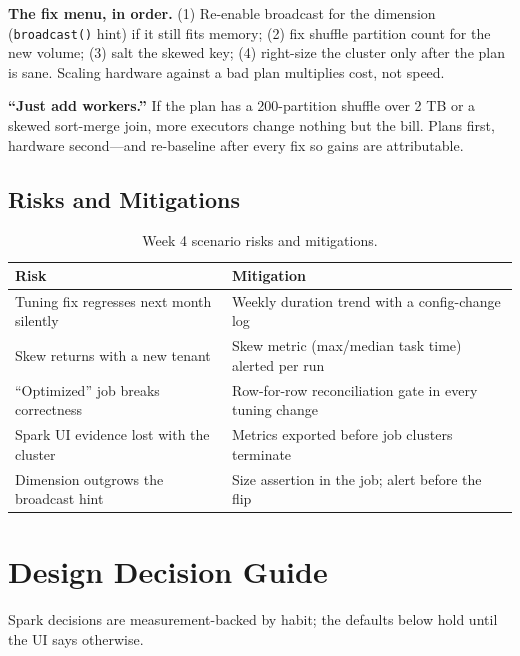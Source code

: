 \textbf{The fix menu, in order.} (1) Re-enable broadcast for the dimension (\texttt{broadcast()} hint) if it still fits memory; (2) fix shuffle partition count for the new volume; (3) salt the skewed key; (4) right-size the cluster only after the plan is sane. Scaling hardware against a bad plan multiplies cost, not speed.

\begin{pitfall}
\textbf{``Just add workers.''} If the plan has a 200-partition shuffle over 2 TB or a skewed sort-merge join, more executors change nothing but the bill. Plans first, hardware second---and re-baseline after every fix so gains are attributable.
\end{pitfall}

\subsection{Risks and Mitigations}
\begin{table}[H]
\centering
\small
\begin{tabular}{@{}p{4.6cm}p{7.6cm}@{}}
\toprule
\textbf{Risk} & \textbf{Mitigation} \\
\midrule
Tuning fix regresses next month silently & Weekly duration trend with a config-change log \\
Skew returns with a new tenant & Skew metric (max/median task time) alerted per run \\
``Optimized'' job breaks correctness & Row-for-row reconciliation gate in every tuning change \\
Spark UI evidence lost with the cluster & Metrics exported before job clusters terminate \\
Dimension outgrows the broadcast hint & Size assertion in the job; alert before the flip \\
\bottomrule
\end{tabular}
\caption{Week 4 scenario risks and mitigations.}
\label{tab:ch4-risks}
\end{table}

\section{Design Decision Guide}
%
Spark decisions are measurement-backed by habit; the defaults below hold until the UI says otherwise.

